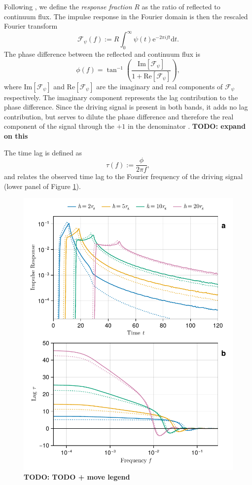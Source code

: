\documentclass[fleqn,usenatbib]{mnras}
\newcommand{\todo}[1]{{\noindent \bf \color{red} TODO: #1}}
\newcommand{\e}{\text{e}}
\renewcommand{\d}{\text{d}}
\renewcommand{\Im}[1]{\text{Im}\left[#1\right]}
\renewcommand{\Re}[1]{\text{Re}\left[#1\right]}
\begin{document}
Following \cite{cackett_modelling_2014}, we define the \textit{response fraction} $R$ as the ratio of reflected to continuum flux. The impulse response in the Fourier domain is then the rescaled Fourier transform
\begin{equation}
	\mathscr{F}_\psi(f) := R \int_{0}^\infty \psi(t) \e^{-2\pi i f t} \d t.
\end{equation}
The phase difference between the reflected and continuum flux is
\begin{equation}
	\phi(f) = \tan^{-1} \left(
		\frac{\Im{\mathscr{F}_\psi}}{1 + \Re{\mathscr{F}_\psi}}
	\right),
\end{equation}
where $\Im{\mathscr{F}_\psi}$ and $\Re{\mathscr{F}_\psi}$ are the imaginary and real components of $\mathscr{F}_\psi$ respectively. The imaginary component represents the lag contribution to the phase difference. Since the driving signal is present in both bands, it adds no lag contribution, but serves to dilute the phase difference and therefore the real component of the signal through the $+1$ in the denominator \citep{cackett_modelling_2014}. \todo{expand on this}

The time lag is defined as
\begin{equation}
	\tau(f) := \frac{\phi}{2 \pi f},
\end{equation}
and relates the observed time lag to the Fourier frequency of the driving signal (lower panel of Figure \ref{fig:reverberation-thin}).

\begin{figure}
	\centering
	\includegraphics[width=0.98\linewidth]{figures/reverberation.thin-disc.pdf}
	\caption{\todo{TODO + move legend}}
	\label{fig:reverberation-thin}
\end{figure}
\end{document}
